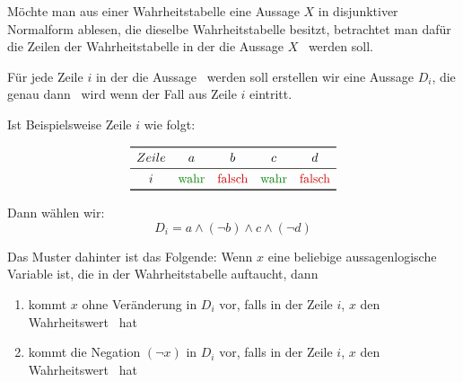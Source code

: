 \documentclass[../../main.tex]{subfiles}
\begin{document}


    Möchte man aus einer Wahrheitstabelle eine Aussage $X$ in disjunktiver Normalform 
    ablesen, die dieselbe Wahrheitstabelle besitzt,
    betrachtet man dafür die Zeilen der Wahrheitstabelle in der die 
    Aussage $X$ \wahr\ werden soll.

    Für jede Zeile $i$ in der die Aussage \wahr\ werden soll 
    erstellen wir eine Aussage
    $D_i$, die genau dann \wahr\  wird wenn der Fall  
    aus Zeile $i$ eintritt. 

    Ist Beispielsweise Zeile $i$ wie folgt:

    \[\begin{array}{ccccc}\toprule
        Zeile & a & b & c & d\\\midrule
        i &\wahr & \falsch & \wahr & \falsch \\ 
        \bottomrule
    \end{array}\]

    Dann wählen wir:
    \[D_i = a \land (\lnot b) \land c \land (\lnot d)\]

    Das Muster dahinter ist das Folgende:
    Wenn $x$ eine beliebige aussagenlogische Variable ist, 
    die in der Wahrheitstabelle auftaucht, dann
    \begin{enumerate}
        \item kommt $x$ ohne Veränderung in $D_i$ vor, falls in der Zeile $i$, $x$ den Wahrheitswert \wahr\ hat 
        \item kommt die Negation $(\lnot x)$ in $D_i$ vor, falls in der Zeile $i$, $x$ den Wahrheitswert \falsch\ hat
    \end{enumerate}
\end{document}
